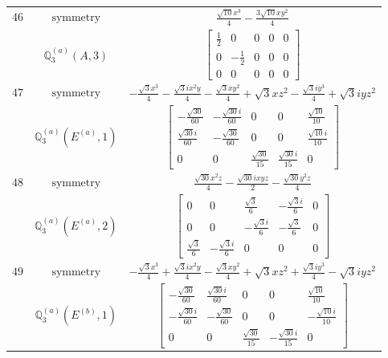 \documentclass[fleqn,8pt,landscape]{jsarticle}
\begin{document}
\begin{longtable}{ccc}
$ 46 $ & $ \text{symmetry} $ & $ \frac{\sqrt{10} x^{3}}{4} - \frac{3 \sqrt{10} x y^{2}}{4} $ \\
$  $ & $ \mathbb{Q}_{3}^{(a)}(A,3) $ & $ \begin{bmatrix} \frac{1}{2} & 0 & 0 & 0 & 0 \\ 0 & - \frac{1}{2} & 0 & 0 & 0 \\ 0 & 0 & 0 & 0 & 0 \end{bmatrix} $ \\ \hline
$ 47 $ & $ \text{symmetry} $ & $ - \frac{\sqrt{3} x^{3}}{4} - \frac{\sqrt{3} i x^{2} y}{4} - \frac{\sqrt{3} x y^{2}}{4} + \sqrt{3} x z^{2} - \frac{\sqrt{3} i y^{3}}{4} + \sqrt{3} i y z^{2} $ \\
$  $ & $ \mathbb{Q}_{3}^{(a)}(E^{(a)},1) $ & $ \begin{bmatrix} - \frac{\sqrt{30}}{60} & - \frac{\sqrt{30} i}{60} & 0 & 0 & \frac{\sqrt{10}}{10} \\ \frac{\sqrt{30} i}{60} & - \frac{\sqrt{30}}{60} & 0 & 0 & \frac{\sqrt{10} i}{10} \\ 0 & 0 & \frac{\sqrt{30}}{15} & \frac{\sqrt{30} i}{15} & 0 \end{bmatrix} $ \\ \hline
$ 48 $ & $ \text{symmetry} $ & $ \frac{\sqrt{30} x^{2} z}{4} - \frac{\sqrt{30} i x y z}{2} - \frac{\sqrt{30} y^{2} z}{4} $ \\
$  $ & $ \mathbb{Q}_{3}^{(a)}(E^{(a)},2) $ & $ \begin{bmatrix} 0 & 0 & \frac{\sqrt{3}}{6} & - \frac{\sqrt{3} i}{6} & 0 \\ 0 & 0 & - \frac{\sqrt{3} i}{6} & - \frac{\sqrt{3}}{6} & 0 \\ \frac{\sqrt{3}}{6} & - \frac{\sqrt{3} i}{6} & 0 & 0 & 0 \end{bmatrix} $ \\ \hline
$ 49 $ & $ \text{symmetry} $ & $ - \frac{\sqrt{3} x^{3}}{4} + \frac{\sqrt{3} i x^{2} y}{4} - \frac{\sqrt{3} x y^{2}}{4} + \sqrt{3} x z^{2} + \frac{\sqrt{3} i y^{3}}{4} - \sqrt{3} i y z^{2} $ \\
$  $ & $ \mathbb{Q}_{3}^{(a)}(E^{(b)},1) $ & $ \begin{bmatrix} - \frac{\sqrt{30}}{60} & \frac{\sqrt{30} i}{60} & 0 & 0 & \frac{\sqrt{10}}{10} \\ - \frac{\sqrt{30} i}{60} & - \frac{\sqrt{30}}{60} & 0 & 0 & - \frac{\sqrt{10} i}{10} \\ 0 & 0 & \frac{\sqrt{30}}{15} & - \frac{\sqrt{30} i}{15} & 0 \end{bmatrix} $ \\ \hline

\end{longtable}
\end{document}
